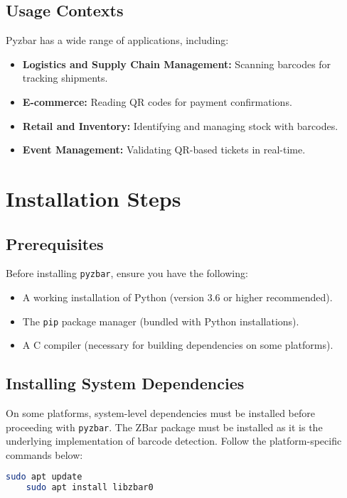 \subsection{Usage Contexts}

Pyzbar has a wide range of applications, including:
\begin{itemize}
	\item \textbf{Logistics and Supply Chain Management:} Scanning barcodes for tracking shipments.
	\item \textbf{E-commerce:} Reading QR codes for payment confirmations.
	\item \textbf{Retail and Inventory:} Identifying and managing stock with barcodes.
	\item \textbf{Event Management:} Validating QR-based tickets in real-time.
\end{itemize}


\section{Installation Steps}

\subsection{Prerequisites}
Before installing \texttt{pyzbar}, ensure you have the following:
\begin{itemize}
	\item A working installation of Python (version 3.6 or higher recommended).
	\item The \texttt{pip} package manager (bundled with Python installations).
	\item A C compiler (necessary for building dependencies on some platforms).\cite{pyzbargithub:2024}
\end{itemize}

\subsection{Installing System Dependencies}
On some platforms, system-level dependencies must be installed before proceeding with \texttt{pyzbar}. The ZBar package must be installed as it is the underlying implementation of barcode detection. Follow the platform-specific commands below:

\begin{lstlisting}[language=bash]
	sudo apt update
	sudo apt install libzbar0
\end{lstlisting}

